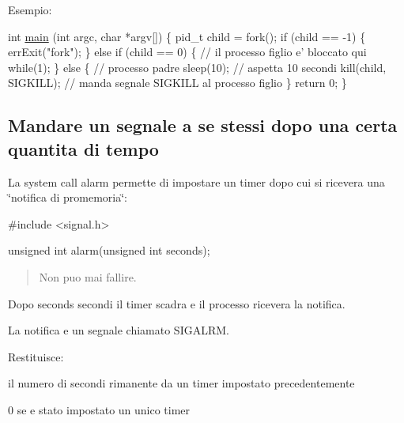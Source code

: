 Esempio\+: 
\begin{DoxyCode}
\textcolor{keywordtype}{int} \hyperlink{client_8h_a0ddf1224851353fc92bfbff6f499fa97}{main} (\textcolor{keywordtype}{int} argc, \textcolor{keywordtype}{char} *argv[]) \{
    pid\_t child = fork();
    \textcolor{keywordflow}{if} (child == -1) \{
        errExit(\textcolor{stringliteral}{"fork"});
    \}
    \textcolor{keywordflow}{else} \textcolor{keywordflow}{if} (child == 0) \{
        \textcolor{comment}{// il processo figlio e' bloccato qui}
        \textcolor{keywordflow}{while}(1);
    \}
    \textcolor{keywordflow}{else} \{
        \textcolor{comment}{// processo padre}
        sleep(10); \textcolor{comment}{// aspetta 10 secondi}
        kill(child, SIGKILL); \textcolor{comment}{// manda segnale SIGKILL al processo figlio}
    \}
    \textcolor{keywordflow}{return} 0;
\}
\end{DoxyCode}


\subsection*{Mandare un segnale a se stessi dopo una certa quantita\textquotesingle{} di tempo}

La system call alarm permette di impostare un timer dopo cui si ricevera\textquotesingle{} una \char`\"{}notifica di promemoria\char`\"{}\+:


\begin{DoxyCode}
\textcolor{preprocessor}{#include <signal.h>}

\textcolor{keywordtype}{unsigned} \textcolor{keywordtype}{int} alarm(\textcolor{keywordtype}{unsigned} \textcolor{keywordtype}{int} seconds);
\end{DoxyCode}
 \begin{quote}
Non puo\textquotesingle{} mai fallire. \end{quote}


Dopo {\ttfamily seconds} secondi il timer scadra\textquotesingle{} e il processo ricevera\textquotesingle{} la notifica.

La notifica e\textquotesingle{} un segnale chiamato {\ttfamily S\+I\+G\+A\+L\+RM}.

Restituisce\+:
\begin{DoxyItemize}
\item il numero di secondi rimanente da un timer impostato precedentemente
\item 0 se e\textquotesingle{} stato impostato un unico timer
\end{DoxyItemize}

